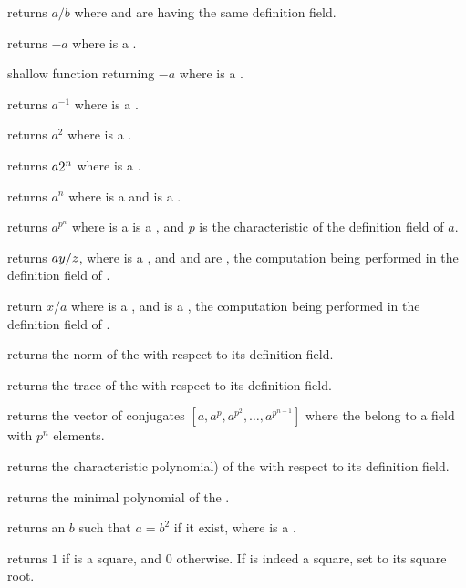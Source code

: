  returns $a/b$ where  and  are
 having the same definition field.

 returns $-a$ where  is a .

 shallow function returning $-a$ where  is a
.

 returns $a^{-1}$ where  is a .

 returns $a^2$ where  is a .

 returns $a\*2^n$ where  is a
.

 returns $a^n$ where  is a 
and  is a .

 returns $a^{p^n}$ where  is a
  is a , and $p$ is the characteristic of the
definition field of $a$.

 returns $a\*y/z$, where 
is a , and  and  are , the computation being
performed in the definition field of .

 return $x/a$ where  is a
, and  is a , the computation being
performed in the definition field of .

 returns the norm of the   with
respect to its definition field.

 returns the trace of the   with
respect to its definition field.

 returns the vector of conjugates
$[a,a^p,a^{p^2},\ldots,a^{p^{n-1}}]$ where the   belong to a
field with $p^n$ elements.

 returns the characteristic polynomial) of the
  with respect to its definition field.

 returns the minimal polynomial of
the  .

 returns an  $b$ such that $a=b^2$ if
it exist, where  is a .

 returns $1$ if  is a
square, and $0$ otherwise. If  is indeed a square, set  to its
square root.


